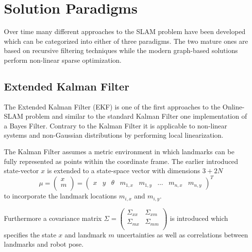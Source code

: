 \section{Solution Paradigms} 
Over time many different approaches to the SLAM problem have been developed which can be categorized into either of three paradigms. The two mature ones are based on recursive filtering techniques while the modern graph-based solutions perform non-linear sparse optimization.

\subsection{Extended Kalman Filter}
The Extended Kalman Filter (EKF) is one of the first approaches to the Online-SLAM problem and similar to the standard Kalman Filter one implementation of a Bayes Filter. Contrary to the Kalman Filter it is applicable to non-linear systems and non-Gaussian distributions by performing local linearization.


The Kalman Filter assumes a metric environment in which landmarks can be fully represented as points within the coordinate frame. The earlier introduced state-vector $ x $ is extended to a state-space vector with dimensions $ 3 + 2N$
\[ \mu = 
\begin{pmatrix}
	x \\
	m \\
\end{pmatrix}
=
\begin{pmatrix}
	x & y & \theta & m_{1, x} & m_{1, y} & \dots & m_{n, x} & m_{n, y} 
\end{pmatrix} ^{T}
\] 
to incorporate the landmark locations $ m_{i, x} $ and $ m_{i, y} $. 

Furthermore a covariance matrix 
$ \Sigma = 
\begin{pmatrix}
	\Sigma_{xx} & \Sigma_{xm} \\
	\Sigma_{mx} & \Sigma_{mm} \\
\end{pmatrix} $ 
is introduced which specifies the state $ x $ and landmark $ m $ uncertainties as well as correlations between landmarks and robot pose. 

